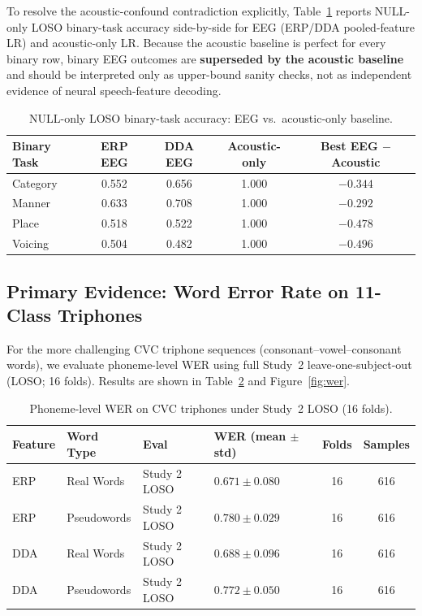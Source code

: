 \documentclass[11pt,a4paper]{article}
\begin{document}
To resolve the acoustic-confound contradiction explicitly,
Table~\ref{tab:acoustic_confound} reports NULL-only LOSO binary-task accuracy
side-by-side for EEG (ERP/DDA pooled-feature LR) and acoustic-only LR. Because
the acoustic baseline is perfect for every binary row, binary EEG outcomes are
\textbf{superseded by the acoustic baseline} and should be interpreted only as
upper-bound sanity checks, not as independent evidence of neural speech-feature
decoding.

\begin{table}[H]
\centering
\caption{NULL-only LOSO binary-task accuracy: EEG vs.\ acoustic-only baseline.}
\label{tab:acoustic_confound}
\begin{tabular}{lcccc}
\toprule
\textbf{Binary Task} & \textbf{ERP EEG} & \textbf{DDA EEG} &
  \textbf{Acoustic-only} & \textbf{Best EEG $-$ Acoustic} \\
\midrule
Category & 0.552 & 0.656 & 1.000 & $-0.344$ \\
Manner   & 0.633 & 0.708 & 1.000 & $-0.292$ \\
Place    & 0.518 & 0.522 & 1.000 & $-0.478$ \\
Voicing  & 0.504 & 0.482 & 1.000 & $-0.496$ \\
\bottomrule
\end{tabular}
\end{table}

\subsection{Primary Evidence: Word Error Rate on 11-Class Triphones}

For the more challenging CVC triphone sequences (consonant--vowel--consonant
words), we evaluate phoneme-level WER using full Study~2 leave-one-subject-out
(LOSO; 16 folds). Results are shown in Table~\ref{tab:wer} and
Figure~\ref{fig:wer}.

\begin{table}[H]
\centering
\caption{Phoneme-level WER on CVC triphones under Study~2 LOSO (16 folds).}
\label{tab:wer}
\begin{tabular}{llllcc}
\toprule
\textbf{Feature} & \textbf{Word Type} & \textbf{Eval} &
  \textbf{WER (mean $\pm$ std)} & \textbf{Folds} & \textbf{Samples} \\
\midrule
ERP & Real Words   & Study 2 LOSO & $\mathbf{0.671 \pm 0.080}$ & 16 & 616 \\
ERP & Pseudowords  & Study 2 LOSO & $0.780 \pm 0.029$           & 16 & 616 \\
DDA & Real Words   & Study 2 LOSO & $0.688 \pm 0.096$           & 16 & 616 \\
DDA & Pseudowords  & Study 2 LOSO & $\mathbf{0.772 \pm 0.050}$ & 16 & 616 \\
\bottomrule
\end{tabular}
\end{table}
\end{document}
